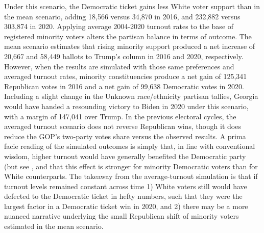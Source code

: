 Under this scenario, the Democratic ticket gains less White voter support than in the mean scenario, adding 18,566 versus 34,870 in 2016, and 232,882 versus 303,874 in 2020. Applying average 2004-2020 turnout rates to the base of registered minority voters alters the partisan balance in terms of outcome. The mean scenario estimates that rising minority support produced a net increase of 20,667 and 58,449 ballots to Trump's column in 2016 and 2020, respectively. However, when the results are simulated with those same preferences and averaged turnout rates, minority constituencies produce a net gain of 125,341 Republican votes in 2016 and a net gain of 99,638 Democratic votes in 2020. Including a slight change in the Unknown race/ethnicity partisan tallies, Georgia would have handed a resounding victory to Biden in 2020 under this scenario, with a margin of 147,041 over Trump. In the previous electoral cycles, the averaged turnout scenario does not reverse Republican wins, though it does reduce the GOP's two-party votes share versus the observed results. A prima facie reading of the simulated outcomes is simply that, in line with conventional wisdom, higher turnout would have generally benefited the Democratic party (but see \citet{martinez_effects_2005}, and that this effect is stronger for minority Democratic voters than for White counterparts. The takeaway from the average-turnout simulation is that if turnout levels remained constant across time 1) White voters still would have defected to the Democratic ticket in hefty numbers, such that they were the largest factor in a Democratic ticket win in 2020, and 2) there may be a more nuanced narrative underlying the small Republican shift of minority voters estimated in the mean scenario. 




